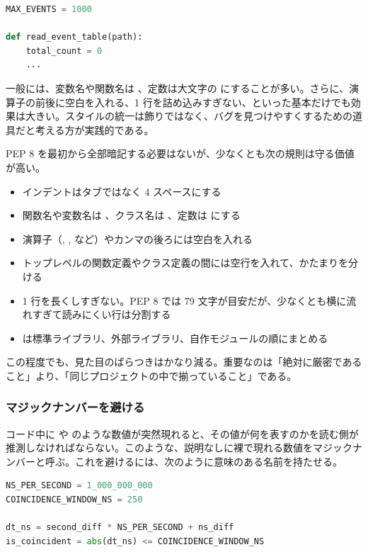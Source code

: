 \begin{lstlisting}[language=Python]
MAX_EVENTS = 1000

def read_event_table(path):
    total_count = 0
    ...
\end{lstlisting}

一般には、変数名や関数名は 、定数は大文字の  にすることが多い。さらに、演算子の前後に空白を入れる、1 行を詰め込みすぎない、といった基本だけでも効果は大きい。スタイルの統一は飾りではなく、バグを見つけやすくするための道具だと考える方が実践的である。

PEP 8 を最初から全部暗記する必要はないが、少なくとも次の規則は守る価値が高い。

\begin{itemize}
\item インデントはタブではなく 4 スペースにする
\item 関数名や変数名は 、クラス名は 、定数は  にする
\item 演算子（\code{=}, \code{+}, \code{-} など）やカンマの後ろには空白を入れる
\item トップレベルの関数定義やクラス定義の間には空行を入れて、かたまりを分ける
\item 1 行を長くしすぎない。PEP 8 では 79 文字が目安だが、少なくとも横に流れすぎて読みにくい行は分割する
\item {} は標準ライブラリ、外部ライブラリ、自作モジュールの順にまとめる
\end{itemize}

この程度でも、見た目のばらつきはかなり減る。重要なのは「絶対に厳密であること」より、「同じプロジェクトの中で揃っていること」である。

\subsubsection{マジックナンバーを避ける}
\label{sec:magic-number}

コード中に  や  のような数値が突然現れると、その値が何を表すのかを読む側が推測しなければならない。このような、説明なしに裸で現れる数値をマジックナンバーと呼ぶ。これを避けるには、次のように意味のある名前を持たせる。

\begin{lstlisting}[language=Python]
NS_PER_SECOND = 1_000_000_000
COINCIDENCE_WINDOW_NS = 250

dt_ns = second_diff * NS_PER_SECOND + ns_diff
is_coincident = abs(dt_ns) <= COINCIDENCE_WINDOW_NS
\end{lstlisting}

